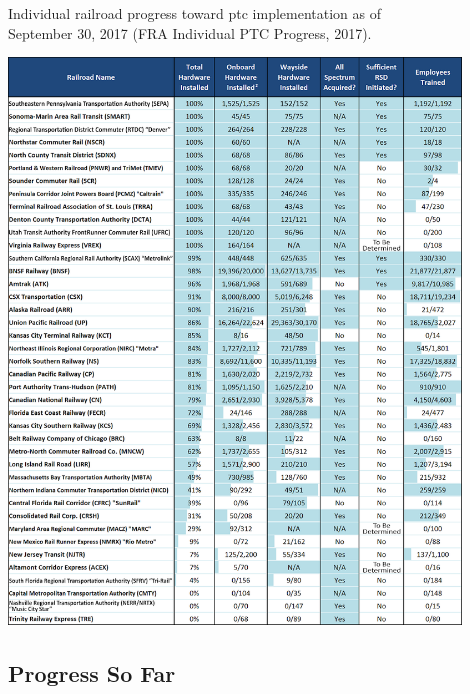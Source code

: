 \documentclass[11pt, titlepage]{article}
\begin{document}
\begin{table}[ht]
    \begin{center}
        \captionsetup{justification=centering}
        \caption[Individual PTC Implementation Progress]{Individual railroad progress
        toward \gls{ptc} implementation as of\\
        September 30, 2017 (FRA Individual PTC Progress, 2017).}
        \includegraphics[width=0.9\textwidth]{RailroadProgressTable.png}
        \label{progress}
    \end{center}
\end{table}

\clearpage
\pagebreak

\subsection{Progress So Far}
\end{document}
